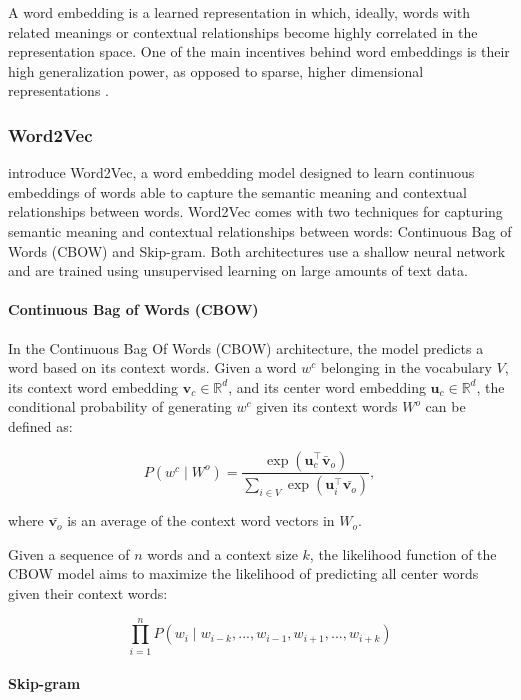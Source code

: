 A word embedding is a learned representation in which, ideally, words with related meanings or contextual relationships become highly correlated in the representation space. One of the main incentives behind word embeddings is their high generalization power, as opposed to sparse, higher dimensional representations \citep{bengio2000neural}.

\subsubsection{Word2Vec}

\citet{mikolov2013efficient} introduce Word2Vec, a word embedding model designed to learn continuous embeddings of words able to capture the semantic meaning and contextual relationships between words. Word2Vec comes with two techniques for capturing semantic meaning and contextual relationships between words: Continuous Bag of Words (CBOW) and Skip-gram. Both architectures use a shallow neural network and are trained using unsupervised learning on large amounts of text data.

\paragraph{Continuous Bag of Words (CBOW)} 
In the Continuous Bag Of Words (CBOW) architecture, the model predicts a word based on its context words. Given a word $w^c$ belonging in the vocabulary $V$, its context word embedding $\bm{v}_c \in \mathbb{R}^{d}$, and its center word embedding $\bm{u}_c \in \mathbb{R}^{d}$, the conditional probability of generating $w^c$ given its context words $W^o$ can be defined as:

\begin{equation}
    P(w^c \mid W^o) = \frac{\exp(\bm{u}_c^{\top}\bar{\bm{v}}_o)}{\sum_{i \in V} \exp(\bm{u}_{i}^{\top}\bar{\bm{v}_o})},
\end{equation}

where $\bar{\bm{v}_o}$ is an average of the context word vectors in $W_o$.

Given a sequence of $n$ words and a context size $k$, the likelihood function of the CBOW model aims to maximize the likelihood of predicting all center words given their context words:

\begin{equation}
    \prod_{i=1}^{n} P(w_i \mid w_{i-k}, ..., w_{i-1},  w_{i+1}, ..., w_{i+k})
\end{equation}

\paragraph{Skip-gram} 

